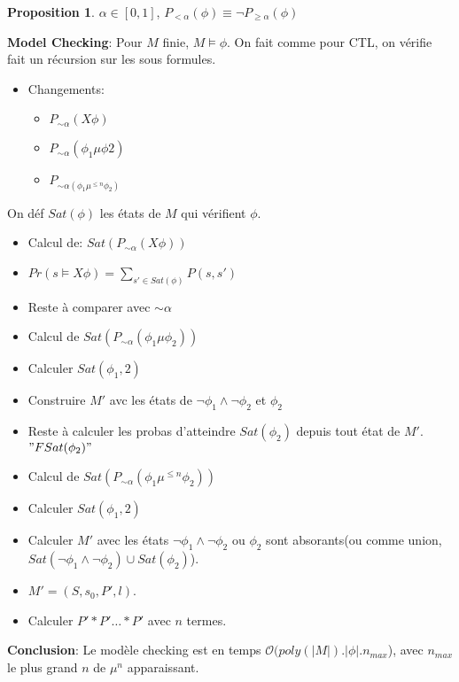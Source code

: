 \documentclass[12pt]{article}
\theoremstyle{plain}
\theoremstyle{definition}
\newtheorem{prop}[subsubsection]{Proposition}
\theoremstyle{remark}
\newcommand{\Or}{\mathcal{O}}
\begin{document}
\begin{prop}
    $\alpha\in[0,1]$, 
    $P_{<\alpha}(\phi)\equiv \neg P_{\geq \alpha}(\phi)$
\end{prop}

\noindent \textbf{Model Checking}:
Pour $M$ finie, $M\vDash \phi$. On fait comme pour CTL,
on vérifie fait un récursion sur les sous formules.\\
\begin{itemize}
    \item Changements:
    \begin{itemize}
        \item $P_{\sim\alpha}(X\phi)$
        \item $P_{\sim\alpha}(\phi_1\mu\phi2)$
        \item $P_{\sim\alpha(\phi_1\mu^{\leq n}\phi_2)}$
    \end{itemize}
\end{itemize}
On déf $Sat(\phi)$ les états de $M$ qui vérifient $\phi$.
\begin{itemize}
    \item Calcul de: $Sat(P_{\sim\alpha}(X\phi))$
    \item $Pr(s\vDash X\phi)=\sum_{s'\in Sat(\phi)}P(s,s')$
    \item Reste à comparer avec $\sim\alpha$
    \item Calcul de $Sat(P_{\sim\alpha}(\phi_1\mu\phi_2))$
    \item Calculer $Sat(\phi_1,2)$
    \item Construire $M'$ avc les états de $\neg\phi_1\wedge 
    \neg\phi_2$ et $\phi_2$
    \item Reste à calculer les probas d'atteindre 
    $Sat(\phi_2)$ depuis tout état de $M'$. $"FSat(\phi_2)"$
    \item Calcul de $Sat(P_{\sim\alpha}(\phi_1\mu^{\leq n}\phi_2))$ 
    \item Calculer $Sat(\phi_1,2)$
    \item Calculer $M'$ avec les états $\neg\phi_1\wedge \neg \phi_2$ ou 
    $\phi_2$ sont absorants(ou comme union, 
    $Sat(\neg\phi_1\wedge \neg\phi_2)\cup Sat(\phi_2)$). 
    \item $M'=(S,s_0,P',l)$.
    \item Calculer $P'*P'\ldots*P'$ avec $n$ termes.
\end{itemize}

\noindent \textbf{Conclusion}: Le modèle checking est 
en temps $\Or(poly(|M|).|\phi|.n_{max}$), avec 
$n_{max}$ le plus grand $n$ de $\mu^{n}$ apparaissant.
\end{document}
